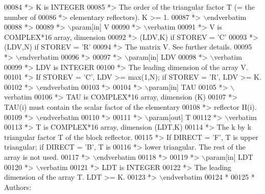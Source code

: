 \begin{DoxyCode}
00084 \textcolor{comment}{*>          K is INTEGER}
00085 \textcolor{comment}{*>          The order of the triangular factor T (= the number of}
00086 \textcolor{comment}{*>          elementary reflectors). K >= 1.}
00087 \textcolor{comment}{*> \(\backslash\)endverbatim}
00088 \textcolor{comment}{*>}
00089 \textcolor{comment}{*> \(\backslash\)param[in] V}
00090 \textcolor{comment}{*> \(\backslash\)verbatim}
00091 \textcolor{comment}{*>          V is COMPLEX*16 array, dimension}
00092 \textcolor{comment}{*>                               (LDV,K) if STOREV = 'C'}
00093 \textcolor{comment}{*>                               (LDV,N) if STOREV = 'R'}
00094 \textcolor{comment}{*>          The matrix V. See further details.}
00095 \textcolor{comment}{*> \(\backslash\)endverbatim}
00096 \textcolor{comment}{*>}
00097 \textcolor{comment}{*> \(\backslash\)param[in] LDV}
00098 \textcolor{comment}{*> \(\backslash\)verbatim}
00099 \textcolor{comment}{*>          LDV is INTEGER}
00100 \textcolor{comment}{*>          The leading dimension of the array V.}
00101 \textcolor{comment}{*>          If STOREV = 'C', LDV >= max(1,N); if STOREV = 'R', LDV >= K.}
00102 \textcolor{comment}{*> \(\backslash\)endverbatim}
00103 \textcolor{comment}{*>}
00104 \textcolor{comment}{*> \(\backslash\)param[in] TAU}
00105 \textcolor{comment}{*> \(\backslash\)verbatim}
00106 \textcolor{comment}{*>          TAU is COMPLEX*16 array, dimension (K)}
00107 \textcolor{comment}{*>          TAU(i) must contain the scalar factor of the elementary}
00108 \textcolor{comment}{*>          reflector H(i).}
00109 \textcolor{comment}{*> \(\backslash\)endverbatim}
00110 \textcolor{comment}{*>}
00111 \textcolor{comment}{*> \(\backslash\)param[out] T}
00112 \textcolor{comment}{*> \(\backslash\)verbatim}
00113 \textcolor{comment}{*>          T is COMPLEX*16 array, dimension (LDT,K)}
00114 \textcolor{comment}{*>          The k by k triangular factor T of the block reflector.}
00115 \textcolor{comment}{*>          If DIRECT = 'F', T is upper triangular; if DIRECT = 'B', T is}
00116 \textcolor{comment}{*>          lower triangular. The rest of the array is not used.}
00117 \textcolor{comment}{*> \(\backslash\)endverbatim}
00118 \textcolor{comment}{*>}
00119 \textcolor{comment}{*> \(\backslash\)param[in] LDT}
00120 \textcolor{comment}{*> \(\backslash\)verbatim}
00121 \textcolor{comment}{*>          LDT is INTEGER}
00122 \textcolor{comment}{*>          The leading dimension of the array T. LDT >= K.}
00123 \textcolor{comment}{*> \(\backslash\)endverbatim}
00124 \textcolor{comment}{*}
00125 \textcolor{comment}{*  Authors:}

\end{DoxyCode}
